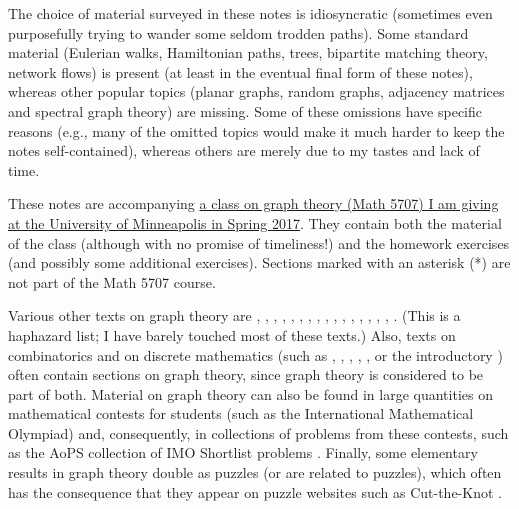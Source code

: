 \documentclass[numbers=enddot,12pt,final,onecolumn,notitlepage]{scrartcl}%
\theoremstyle{definition}
\begin{document}
The choice of material surveyed in these notes is idiosyncratic
(sometimes even purposefully trying to wander some seldom trodden
paths). Some standard material (Eulerian walks, Hamiltonian paths,
trees, bipartite matching theory, network flows) is present (at least
in the eventual final form of these notes), whereas
other popular topics (planar graphs, random graphs, adjacency matrices
and spectral graph theory) are missing. Some of these omissions have
specific reasons (e.g., many of the omitted topics would make it much
harder to keep the notes self-contained), whereas others are merely
due to my tastes and lack of time.

These notes are accompanying
\href{http://www.math.umn.edu/~dgrinber/5707s17/}{a
class on graph theory (Math 5707) I am giving at the University of
Minneapolis in Spring 2017}. They contain both the
material of the class (although with no promise of timeliness!) and the
homework exercises (and possibly some additional exercises).
Sections marked with an asterisk (*) are not part of the Math 5707
course.

Various other texts on graph theory are \cite{Bollob79},
\cite{Bollob98}, \cite{Harary69}, \cite{Harju14},
\cite{BonMur76}, \cite{Ore62}, \cite{BehCha71}, \cite{BeChZh15},
\cite{BonMur08}, \cite{Ruohon13}, \cite{Dieste16}, \cite{Ore90},
\cite{HaHiMo08}, \cite{Berge91}, \cite{ChaLes15}, \cite{Griffi15},
\cite{Wilson96}.
(This is a haphazard list; I have barely touched most of these texts.)
Also, texts on combinatorics and on discrete mathematics (such as
\cite{BenWil12}, \cite{KelTro15}, \cite{PoTaWo83}, \cite{Bona11},
\cite{Guicha16},
or the introductory \cite{LoPeVe03}) often contain
sections on graph theory, since graph theory is considered to be part
of both.
Material on graph theory can also be found in large quantities on
mathematical contests for students (such as the International
Mathematical Olympiad) and, consequently, in collections of problems
from these contests, such as the AoPS collection of IMO Shortlist
problems \cite{AoPS-ISL}.
Finally, some elementary results in graph theory double as puzzles
(or are related to puzzles), which often has the consequence that they
appear on puzzle websites such as Cut-the-Knot \cite{cut-the-knot}.
\end{document}
